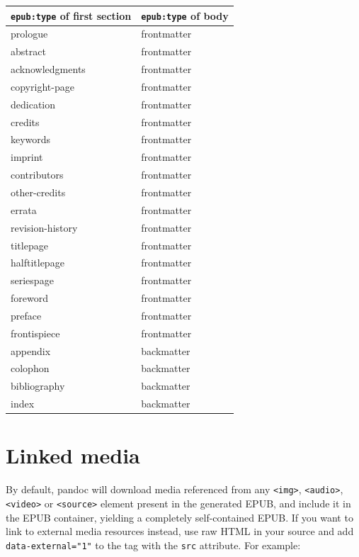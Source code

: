 \documentclass[
  b5paper
]{book}
\begin{document}
\begin{longtable}[]{@{}ll@{}}
\toprule\noalign{}
\texttt{epub:type} of first section & \texttt{epub:type} of body \\
\midrule\noalign{}
\endhead
\bottomrule\noalign{}
\endlastfoot
prologue & frontmatter \\
abstract & frontmatter \\
acknowledgments & frontmatter \\
copyright-page & frontmatter \\
dedication & frontmatter \\
credits & frontmatter \\
keywords & frontmatter \\
imprint & frontmatter \\
contributors & frontmatter \\
other-credits & frontmatter \\
errata & frontmatter \\
revision-history & frontmatter \\
titlepage & frontmatter \\
halftitlepage & frontmatter \\
seriespage & frontmatter \\
foreword & frontmatter \\
preface & frontmatter \\
frontispiece & frontmatter \\
appendix & backmatter \\
colophon & backmatter \\
bibliography & backmatter \\
index & backmatter \\
\end{longtable}

\section{Linked media}\label{linked-media}

By default, pandoc will download media referenced from any
\texttt{\textless{}img\textgreater{}},
\texttt{\textless{}audio\textgreater{}},
\texttt{\textless{}video\textgreater{}} or
\texttt{\textless{}source\textgreater{}} element present in the
generated EPUB, and include it in the EPUB container, yielding a
completely self-contained EPUB. If you want to link to external media
resources instead, use raw HTML in your source and add
\texttt{data-external="1"} to the tag with the \texttt{src} attribute.
For example:
\end{document}
